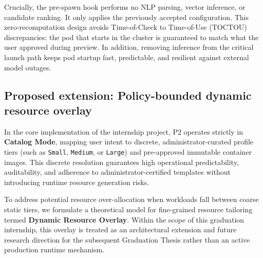 Crucially, the pre-spawn hook performs no NLP parsing, vector inference, or candidate ranking. It only applies the previously accepted configuration. This zero-recomputation design avoids Time-of-Check to Time-of-Use (TOCTOU) discrepancies: the pod that starts in the cluster is guaranteed to match what the user approved during preview. In addition, removing inference from the critical launch path keeps pod startup fast, predictable, and resilient against external model outages.

\subsection{Proposed extension: Policy-bounded dynamic resource overlay}
\label{subsec:dynamic_resource_overlay}

In the core implementation of the internship project, P2 operates strictly in \textbf{Catalog Mode}, mapping user intent to discrete, administrator-curated profile tiers (such as \texttt{Small}, \texttt{Medium}, or \texttt{Large}) and pre-approved immutable container images. This discrete resolution guarantees high operational predictability, auditability, and adherence to administrator-certified templates without introducing runtime resource generation risks.

To address potential resource over-allocation when workloads fall between coarse static tiers, we formulate a theoretical model for fine-grained resource tailoring termed \textbf{Dynamic Resource Overlay}. Within the scope of this graduation internship, this overlay is treated as an architectural extension and future research direction for the subsequent Graduation Thesis rather than an active production runtime mechanism.

